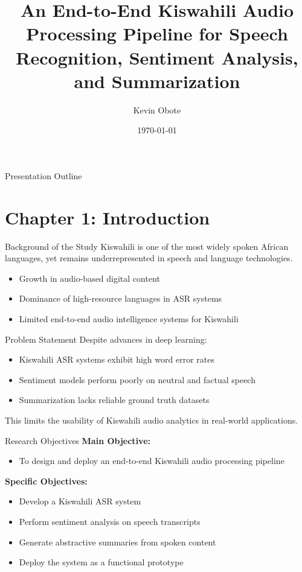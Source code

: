 \documentclass{beamer}
\title[Kiswahili Audio Intelligence Pipeline]
{An End-to-End Kiswahili Audio Processing Pipeline for Speech Recognition, Sentiment Analysis, and Summarization}
\author{Kevin Obote}
\institute{
Strathmore University \\ iLabAfrica \\
\vspace{0.2cm}
\textbf{Supervisor:} Dr. Betsy Muriithi
}
\date{\today}
\begin{document}
\begin{frame}
\titlepage
\end{frame}

\begin{frame}{Presentation Outline}
\tableofcontents
\end{frame}

\section{Chapter 1: Introduction}

\begin{frame}{Background of the Study}
Kiswahili is one of the most widely spoken African languages, yet remains underrepresented in speech and language technologies.
\begin{itemize}
    \item Growth in audio-based digital content
    \item Dominance of high-resource languages in ASR systems
    \item Limited end-to-end audio intelligence systems for Kiswahili
\end{itemize}
\end{frame}

\begin{frame}{Problem Statement}
Despite advances in deep learning:
\begin{itemize}
    \item Kiswahili ASR systems exhibit high word error rates
    \item Sentiment models perform poorly on neutral and factual speech
    \item Summarization lacks reliable ground truth datasets
\end{itemize}
This limits the usability of Kiswahili audio analytics in real-world applications.
\end{frame}

\begin{frame}{Research Objectives}
\textbf{Main Objective:}
\begin{itemize}
    \item To design and deploy an end-to-end Kiswahili audio processing pipeline
\end{itemize}

\textbf{Specific Objectives:}
\begin{itemize}
    \item Develop a Kiswahili ASR system
    \item Perform sentiment analysis on speech transcripts
    \item Generate abstractive summaries from spoken content
    \item Deploy the system as a functional prototype
\end{itemize}
\end{frame}
\end{document}
